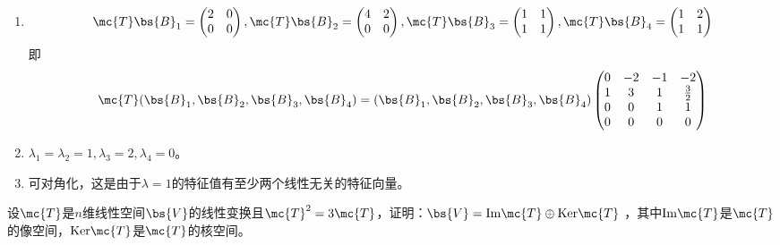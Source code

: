 \documentclass[12pt, a4paper, oneside, UTF8]{ctexbook}
\begin{document}
\begin{solution}
    \begin{enumerate}[label=(\arabic{*})]
        \item 
        \begin{align*}
            \mc{T}\bs{B}_1=\begin{pmatrix}
                2&0\\
                0&0
            \end{pmatrix},\mc{T}\bs{B}_2=\begin{pmatrix}
                4&2\\
                0&0
            \end{pmatrix},\mc{T}\bs{B}_3=\begin{pmatrix}
                1&1\\
                1&1
            \end{pmatrix},\mc{T}\bs{B}_4=\begin{pmatrix}
                1&2\\
                1&1
            \end{pmatrix}
        \end{align*}
        即
        \begin{align*}
            \mc{T}(\bs{B}_1,\bs{B}_2,\bs{B}_3,\bs{B}_4)=(\bs{B}_1,\bs{B}_2,\bs{B}_3,\bs{B}_4)
            \begin{pmatrix}
                0& -2&-1&-2  \\
                1 & 3&1 &\frac{3}{2} \\
                0& 0& 1& 1\\
                0& 0& 0&0
            \end{pmatrix}
        \end{align*}
        \item $\lambda_1=\lambda_2=1,\lambda_3=2,\lambda_4=0$。
        \item 可对角化，这是由于$\lambda=1$的特征值有至少两个线性无关的特征向量。
    \end{enumerate} 
\end{solution}



\begin{question}
    设$\mc{T}$是$n$维线性空间$\bs{V}$的线性变换且$\mc{T}^2=3\mc{T}$，证明：$\bs{V}=\mathrm{Im}\mc{T}\oplus \mathrm{Ker}\mc{T}$
，其中$\mathrm{Im}\mc{T}$是$\mc{T}$的像空间，$\mathrm{Ker}\mc{T}$是$\mc{T}$的核空间。
\end{question}
\end{document}
